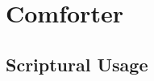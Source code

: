 \section{Comforter}
	\label{COMFORTER}
	




	


\subsection{Scriptural Usage} %
	\label{COMFORTER-SCRIPTURES}

